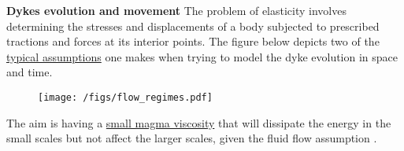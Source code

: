 \documentclass[9pt]{beamer}
\newcommand\Fontvi{\fontsize{6}{7.2}\selectfont}
\begin{document}
\begin{frame}[allowframebreaks]{\textbf{Dykes evolution and movement}}
\Fontvi
The problem of elasticity involves determining the stresses and displacements of a body subjected to prescribed tractions and forces at its interior points. The figure below depicts two of the \underline{typical assumptions} one makes when trying to model the dyke evolution in space and time. \\
    \begin{figure}
        \centering
    \texttt{[image: /figs/flow\_regimes.pdf]}
    \end{figure}
    The aim is having a \underline{small magma viscosity} that will dissipate the energy in the small scales but not affect the larger scales, given the fluid flow assumption \colorbox{yellow}{\cite{peltier2007}}.
\end{frame}
\end{document}
